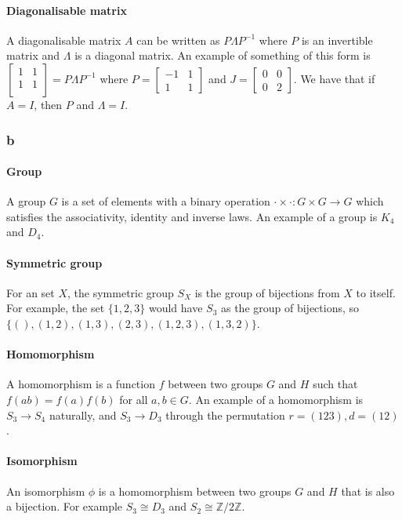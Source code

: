 \documentclass[]{article}
\begin{document}
\paragraph{Diagonalisable matrix} A diagonalisable matrix $A$ can be written as $P \Lambda P^{-1}$ where $P$ is an invertible matrix and $\Lambda$ is a diagonal matrix. An example of something of this form is
$
\begin{bmatrix}
	1 & 1 \\
	1 & 1 \\
\end{bmatrix}
= P\Lambda P^{-1}
$
where $P = 
\begin{bmatrix}
	-1& 1\\
	1 & 1 
\end{bmatrix}
$
and $J = \begin{bmatrix}
	0 & 0 \\
	0 & 2
\end{bmatrix}
$.
We have that if $A = I$, then $P$ and $\Lambda = I$. 
\subsubsection*{b}

\paragraph{Group}
A group $G$ is a set of elements with a binary operation $ \cdot \times \cdot : G \times G \rightarrow G$ which satisfies the associativity, identity and inverse laws. An example of a group is $K_4$ and $D_4$.
\paragraph{Symmetric group} For an set $X$, the symmetric group $S_X$ is the group of bijections from $X$ to itself. For example, the set $\lbrace 1, 2, 3\rbrace$ would have $S_3$ as the group of bijections, so $\lbrace (), (1, 2), (1, 3), (2, 3), (1,2,3), (1, 3, 2) \rbrace$. 
\paragraph{Homomorphism} A homomorphism is a function $f$ between two groups $G$ and $H$ such that $f(ab) = f(a) f(b)$ for all $a, b \in G$.  An example of a homomorphism is $S_3 \rightarrow S_4$ naturally, and $S_3 \rightarrow D_3$ through the permutation $r = (123), d = (12)$. 
\paragraph{Isomorphism} An isomorphism $\phi$ is a homomorphism between two groups $G$ and $H$ that is also a bijection. For example $S_3 \cong D_3$ and $S_2 \cong \mathbb{Z}/2 \mathbb{Z}$. 
\end{document}
